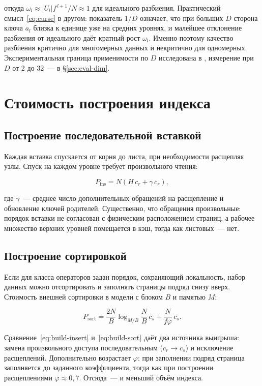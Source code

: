 откуда $\omega_l \approx |U_l| f^{\,l+1}/N \approx 1$ для идеального разбиения.
Практический смысл~\eqref{eq:curse} в другом: показатель $1/D$ означает, что при
больших $D$ сторона ключа $a_l$ близка к единице уже на средних уровнях, и
малейшее отклонение разбиения от идеального даёт кратный рост $\omega_l$.
Именно поэтому качество разбиения критично для многомерных данных и
некритично для одномерных. Экспериментальная граница применимости по $D$
исследована в \cite{borodin2016highd}, измерение при $D$ от 2 до 32~---
в §\ref{sec:eval-dim}.

\section{Стоимость построения индекса}

\subsection{Построение последовательной вставкой}

Каждая вставка спускается от корня до листа, при необходимости расщепляя узлы.
Спуск на каждом уровне требует произвольного чтения:

\begin{equation}
\label{eq:build-insert}
P_{\text{ins}} = N \left( H \, c_r + \gamma \, c_r \right),
\end{equation}

где $\gamma$~--- среднее число дополнительных обращений на расщепление и
обновление ключей родителей. Существенно, что обращения произвольные: порядок
вставки не согласован с физическим расположением страниц, а рабочее множество
верхних уровней помещается в кэш, тогда как листовых~--- нет.

\subsection{Построение сортировкой}

Если для класса операторов задан порядок, сохраняющий локальность, набор данных
можно отсортировать и заполнять страницы подряд снизу вверх. Стоимость внешней
сортировки в модели с блоком $B$ и памятью $M$:

\begin{equation}
\label{eq:build-sort}
P_{\text{sort}} = \frac{2N}{B}\log_{M/B}\frac{N}{B}\, c_s + \frac{N}{f\varphi}\, c_s .
\end{equation}

Сравнение~\eqref{eq:build-insert} и~\eqref{eq:build-sort} даёт два источника
выигрыша: замена произвольного доступа последовательным ($c_r \to c_s$) и
исключение расщеплений. Дополнительно возрастает $\varphi$: при заполнении
подряд страница заполняется до заданного коэффициента, тогда как при построении
расщеплениями $\varphi \approx 0{,}7$. Отсюда~--- и меньший объём индекса.

